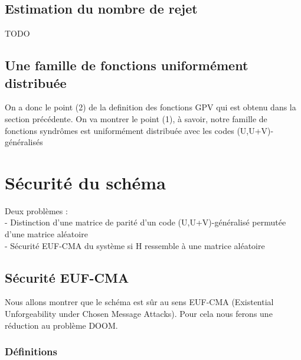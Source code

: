 \documentclass[12pt]{article}
\theoremstyle{definition}
\begin{document}
\subsection{Estimation du nombre de rejet}
TODO \\

\subsection{Une famille de fonctions uniformément distribuée}
On a donc le point (2) de la definition des fonctions GPV qui est obtenu dans la section précédente. On va montrer le point (1), à savoir, notre famille de fonctions syndrômes est uniformément distribuée avec les codes (U,U+V)-généralisés \\

\section{Sécurité du schéma}
Deux problèmes : \\
- Distinction d'une matrice de parité d'un code (U,U+V)-généralisé permutée d'une matrice aléatoire \\
- Sécurité EUF-CMA du système si H ressemble à une matrice aléatoire \\

\subsection{Sécurité EUF-CMA}
Nous allons montrer que le schéma est sûr au sens EUF-CMA (Existential Unforgeability under Chosen Message Attacks). Pour cela nous ferons une réduction au problème DOOM.
\subsubsection{Définitions}
\end{document}
